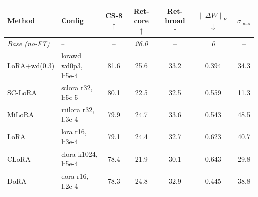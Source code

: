 \begin{tabular}{l l c c c c c}
\toprule
Method & Config & CS-8 $\uparrow$ & Ret-core $\uparrow$ & Ret-broad $\uparrow$ & $\|\Delta W\|_F$ $\downarrow$ & $\sigma_{\max}$ \\
\midrule
\textit{Base (no-FT)} & -- & -- & \textit{26.0} & -- & \textit{0} & -- \\
\midrule
LoRA+wd(0.3) & lorawd wd0p3, lr5e-4 & 81.6 & 25.6 & 33.2 & 0.394 & 34.3 \\
SC-LoRA & sclora r32, lr5e-5 & 80.1 & 22.5 & 32.5 & 0.559 & 11.3 \\
MiLoRA & milora r32, lr3e-4 & 79.9 & 24.7 & 33.6 & 0.543 & 48.5 \\
LoRA & lora r16, lr3e-4 & 79.1 & 24.4 & 32.7 & 0.623 & 40.7 \\
CLoRA & clora k1024, lr5e-4 & 78.4 & 21.9 & 30.1 & 0.643 & 29.8 \\
DoRA & dora r16, lr2e-4 & 78.3 & 24.8 & 32.9 & 0.445 & 38.8 \\
\bottomrule
\end{tabular}
